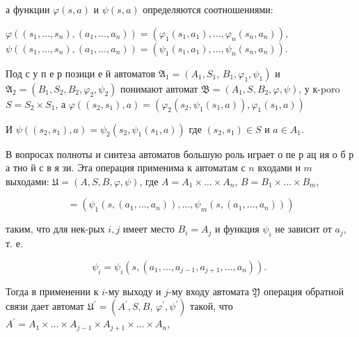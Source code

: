 \documentclass[10pt]{article}
\begin{document}
а функции $\varphi(s, a)$ и $\psi(s, a)$ определяются соотношениями:



$\varphi\left(\left(s_{1}, \ldots, s_{n}\right),\left(a_{1}, \ldots, a_{n}\right)\right)=\left(\varphi_{1}\left(s_{1}, a_{1}\right), \ldots, \varphi_{n}\left(s_{n}, a_{n}\right)\right)$, $\psi\left(\left(s_{1}, \ldots, s_{n}\right),\left(a_{1}, \ldots, a_{n}\right)\right)=\left(\psi_{1}\left(s_{1}, a_{1}\right), \ldots, \psi_{n}\left(s_{n}, a_{n}\right)\right)$.



Под с у п е р позици е й автоматов $\mathfrak{A}_{1}=\left(A_{1}, S_{1}\right.$, $\left.B_{1}, \varphi_{1}, \psi_{1}\right)$ и $\mathfrak{A}_{2}=\left(B_{1}, S_{2}, B_{2}, \varphi_{2}, \psi_{2}\right)$ понимают автомат $\mathfrak{B}=\left(A_{1}, S, B_{2}, \varphi, \psi\right)$, у к-poro $S=S_{2} \times S_{1}$, а $\varphi\left(\left(s_{2}, s_{1}\right), a\right)=\left(\varphi_{2}\left(s_{2}, \psi_{1}\left(s_{1}, a\right)\right), \varphi_{1}\left(s_{1}, a\right)\right)$



И $\psi\left(\left(s_{2}, s_{1}\right), a\right)=\psi_{2}\left(s_{2}, \psi_{1}\left(s_{1}, a\right)\right)$ где $\left(s_{2}, s_{1}\right) \in S$ и $a \in A_{1}$.



В вопросах полноты и синтеза автоматов большую роль играет о пе р ац ия о б р а тно й с в я зи. Эта операция применима к автоматам с $n$ входами и $m$ выходами: $\mathfrak{U}=(A, S, B, \varphi, \psi)$, где $A=A_{1} \times \ldots \times A_{n}$, $B=B_{1} \times \ldots \times B_{m}$,



\[

=\left(\psi_{1}\left(s,\left(a_{1}, \ldots, a_{n}\right)\right), \ldots, \psi_{m}\left(s,\left(a_{1}, \ldots, a_{n}\right)\right)\right)

\]



таким, что для нек-рых $i, j$ имеет место $B_{i}=A_{j}$ и функция $\psi_{i}$ не зависит от $a_{j}$, т. е.



\[

\psi_{i}=\psi_{i}\left(s,\left(a_{1}, \ldots, a_{j-1}, a_{j+1}, \ldots, a_{n}\right)\right) \text {. }

\]



Тогда в применении к $i$-му выходу и $j$-му входу автомата $\mathfrak{Y}$ операция обратной связи дает автомат $\mathfrak{U}^{\prime}=\left(A^{\prime}, S, B\right.$, $\left.\varphi^{\prime}, \psi^{\prime}\right)$ такой, что $A^{\prime}=A_{1} \times \ldots \times A_{j-1} \times A_{j+1} \times \ldots \times A_{n}$,
\end{document}
